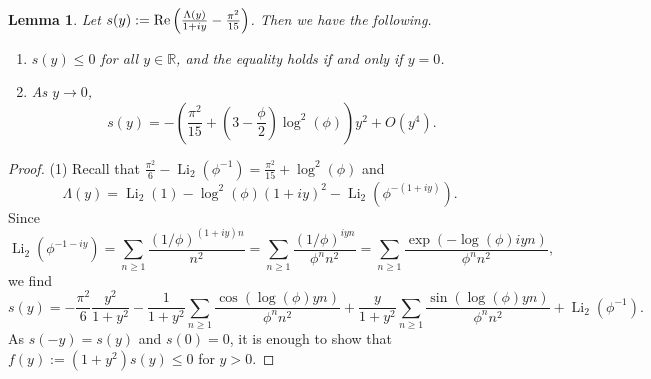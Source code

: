 \documentclass[11pt,reqno]{amsart}
\newtheorem{lemma}[theorem]{Lemma}
\theoremstyle{remark}
\numberwithin{equation}{section}
\def\Li{\operatorname{Li}}
\renewcommand{\Re}{{\rm Re}}
\renewcommand{\Re}{{\rm Re}}
\def\Li{\operatorname{Li}}
\begin{document}
\begin{lemma}\label{lem:s}
	Let $s(y):=\Re\left(\frac{\Lambda(y)}{1+iy} - \frac{\pi^2}{15}\right)$. Then we have the following.
	\begin{enumerate}
		\item $s(y) \leq 0$ for all $y \in \mathbb{R}$, and the equality holds if and only if $y=0$.
		\item As $y \to 0$,
		\[
			s(y) = - \left(\frac{\pi^2}{15} + \left( 3- \frac{\phi}{2}\right)\log^2(\phi) \right)y^2 + O\left(y^4\right).
		\]
	\end{enumerate}
\end{lemma}
\begin{proof}
(1) Recall that $\frac{\pi^2}{6} - \Li_2 (\phi^{-1}) = \frac{\pi^2}{15} + \log^2(\phi)$ and
\[
	\Lambda(y) = \Li_2 (1) - \log^2(\phi) (1+iy)^2 - \Li_2 ( \phi^{-(1+iy)} ).
\]
Since
\[
	\Li_2 (\phi^{-1-iy}) = \sum_{n \ge 1} \frac{ (1/\phi)^{(1+iy)n} }{n^2} = \sum_{n \ge 1} \frac{(1/\phi)^{i y n}}{\phi^n n^2} = \sum_{n \ge 1} \frac{\exp \left( -  \log(\phi) i y n \right)}{\phi^n n^2},
\]
we find 
\[
	s(y) = - \frac{\pi^2}{6} \frac{y^2}{1+y^2} - \frac{1}{1+y^2} \sum_{n \ge 1} \frac{ \cos \left( \log(\phi) y n \right)}{\phi^n n^2} + \frac{y}{1+y^2} \sum_{n \ge 1} \frac{ \sin \left( \log(\phi) y n \right)}{\phi^n n^2}  + \Li_2 (\phi^{-1}).
\]
As $s(-y)=s(y)$ and $s(0)=0$, it is enough to show that $f(y):= (1+y^2)s(y) \leq 0$ for $y > 0$.


\end{proof}
\end{document}

